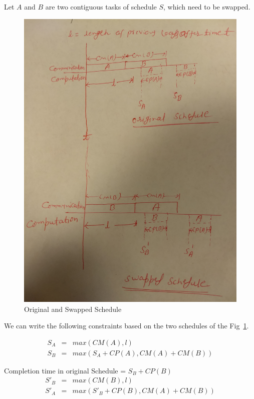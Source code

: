 \documentclass[runningheads]{llncs} %
\begin{document}
	
	Let $A$ and $B$ are two contiguous tasks of schedule $S$, which need to be swapped.
	\begin{figure}[htb]
		\centering
		\includegraphics[width=\textwidth, height=0.5\textheight, 
		keepaspectratio]{Figs/swappedSchedule.jpg}
		\caption{ \label{fig:bothSchedule} Original and Swapped Schedule}
	\end{figure}
	
	We can write the following constraints based on the two schedules of the Fig~\ref{fig:bothSchedule}.
	
	\begin{eqnarray*}
		S_A & = & max(CM(A), l) \\
		S_B & = & max(S_A + CP(A), CM(A) + CM(B))
	\end{eqnarray*}
	
	Completion time in original Schedule = $S_B + CP(B)$
	\begin{eqnarray*}
		S'_B & = & max(CM(B), l) \\
		S'_A & = & max(S'_B + CP(B), CM(A) + CM(B))
	\end{eqnarray*}
	
\end{document}
